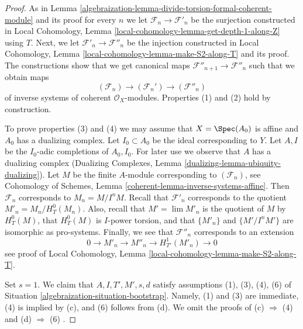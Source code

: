 \begin{proof}

As in Lemma \ref{algebraization-lemma-divide-torsion-formal-coherent-module} and its proof
for every $n$ we let $\mathcal{F}_n \to \mathcal{F}'_n$ be the surjection
constructed in
Local Cohomology, Lemma \ref{local-cohomology-lemma-get-depth-1-along-Z}
using $T$.
Next, we let $\mathcal{F}'_n \to \mathcal{F}''_n$ be the injection
constructed in
Local Cohomology, Lemma \ref{local-cohomology-lemma-make-S2-along-T}
and its proof. The constructions show that we get canonical maps
$\mathcal{F}''_{n + 1} \to \mathcal{F}''_n$ such that we obtain
maps
$$
(\mathcal{F}_n) \longrightarrow (\mathcal{F}_n') \longrightarrow
(\mathcal{F}''_n)
$$
of inverse systems of coherent $\mathcal{O}_X$-modules.
Properties (1) and (2) hold by construction.

\medskip\noindent
To prove properties (3) and (4) we may assume that $X = \Spec(A_0)$ is
affine and $A_0$ has a dualizing complex. Let $I_0 \subset A_0$ be the
ideal corresponding to $Y$. Let $A, I$ be the $I_0$-adic completions of
$A_0, I_0$. For later use we observe that $A$ has a dualizing complex
(Dualizing Complexes, Lemma \ref{dualizing-lemma-ubiquity-dualizing}).
Let $M$ be the finite $A$-module corresponding to $(\mathcal{F}_n)$, see
Cohomology of Schemes, Lemma \ref{coherent-lemma-inverse-systems-affine}.
Then $\mathcal{F}_n$ corresponds to $M_n = M/I^nM$. Recall that
$\mathcal{F}'_n$ corresponds to the quotient $M'_n = M_n / H^0_T(M_n)$.
Also, recall that $M' = \lim M'_n$ is the quotient of $M$ by
$H^0_T(M)$, that $H^0_T(M)$ is $I$-power torsion, and that
$\{M'_n\}$ and $\{M'/I^nM'\}$ are isomorphic as pro-systems.
Finally, we see that $\mathcal{F}''_n$ corresponds to an extension
$$
0 \to M'_n \to M''_n \to H^1_{T'}(M'_n) \to 0
$$
see proof of
Local Cohomology, Lemma \ref{local-cohomology-lemma-make-S2-along-T}.

\medskip\noindent
Set $s = 1$. We claim that $A, I, T', M', s, d$ satisfy assumptions
(1), (3), (4), (6) of Situation \ref{algebraization-situation-bootstrap}. Namely, (1) and (3)
are immediate, (4) is implied by (c), and (6) follows from (d).
We omit the proofs of (c) $\Rightarrow$ (4) and (d) $\Rightarrow$ (6) .


\end{proof}
